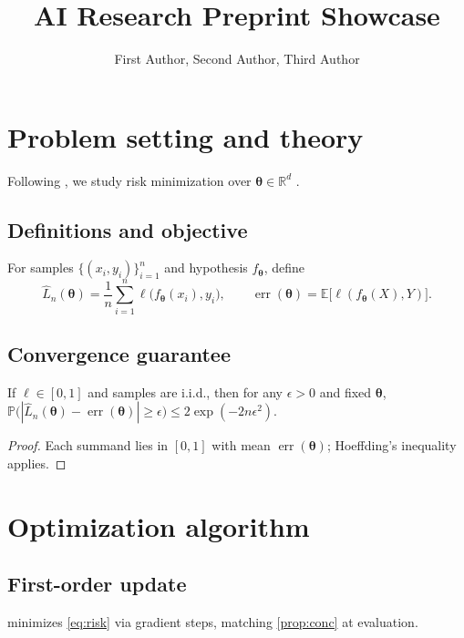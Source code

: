 \documentclass[11pt]{article}
\title{AI Research Preprint Showcase}
\author{First Author\affil{1}, Second Author\affil{1,2}, Third Author\affil{2}}
\affil{2}Collaborating Institution, City, Country}
\date{}
\newcommand{\R}{\mathbb{R}}
\begin{document}
\maketitle

\section{Problem setting and theory}\label{sec:theory}
Following \citet{bessa2026emeans}, we study risk minimization over $\symbf{\theta}\in\R^{d}$ \citep{saerens2026bayesiananytimeparetoset}.

\subsection{Definitions and objective}\label{sec:defs}
\begin{definition}\label{def:risk}
For samples $\{(x_i,y_i)\}_{i=1}^{n}$ and hypothesis $f_{\symbf{\theta}}$, define
\begin{equation}\label{eq:risk}
  \widehat{L}_n(\symbf{\theta}) = \frac{1}{n}\sum_{i=1}^{n}\ell\bigl(f_{\symbf{\theta}}(x_i),y_i\bigr),
  \qquad
  \operatorname{err}(\symbf{\theta}) = \mathbb{E}\bigl[\ell(f_{\symbf{\theta}}(X),Y)\bigr].
\end{equation}
\end{definition}

\subsection{Convergence guarantee}\label{sec:guarantee}
\begin{proposition}[Concentration]\label{prop:conc}
If $\ell\in[0,1]$ and samples are i.i.d., then for any $\epsilon>0$ and fixed $\symbf{\theta}$,
$\mathbb{P}\bigl(|\widehat{L}_n(\symbf{\theta})-\operatorname{err}(\symbf{\theta})|\geq\epsilon\bigr)\leq 2\exp(-2n\epsilon^2)$.
\end{proposition}
\begin{proof}
Each summand lies in $[0,1]$ with mean $\operatorname{err}(\symbf{\theta})$; Hoeffding's inequality applies.
\end{proof}

\section{Optimization algorithm}\label{sec:algo}
\subsection{First-order update}\label{sec:sgd}
 minimizes \eqref{eq:risk} via gradient steps, matching \cref{prop:conc} at evaluation.
\begin{algorithm}[htbp]
\caption{Stochastic gradient optimization}\label{alg:sgd}
\;
\end{algorithm}



\end{document}
